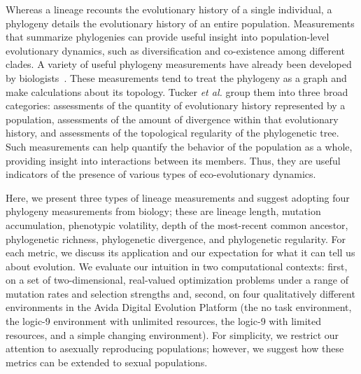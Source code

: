 \documentclass[letterpaper]{article}
\begin{document}
Whereas a lineage recounts the evolutionary history of a single individual, a phylogeny details the evolutionary history of an entire population. Measurements that summarize phylogenies can provide useful insight into population-level evolutionary dynamics, such as diversification and co-existence among different clades. A variety of useful phylogeny measurements have already been developed by biologists~\citep{tucker_guide_2017}. These measurements tend to treat the phylogeny as a graph and make calculations about its topology. Tucker \textit{et al.} group them into three broad categories: assessments of the quantity of evolutionary history represented by a population, assessments of the amount of divergence within that evolutionary history, and assessments of the topological regularity of the phylogenetic tree. Such measurements can help quantify the behavior of the population as a whole, providing insight into interactions between its members. Thus, they are useful indicators of the presence of various types of eco-evolutionary dynamics.

Here, we present three types of lineage measurements and suggest adopting four phylogeny measurements from biology; these are lineage length, mutation accumulation, phenotypic volatility, depth of the most-recent common ancestor, phylogenetic richness, phylogenetic divergence, and phylogenetic regularity.
For each metric, we discuss its application and our expectation for what it can tell us about evolution. 
We evaluate our intuition in two computational contexts: first, on a set of two-dimensional, real-valued optimization problems under a range of mutation rates and selection strengths and, second, on four qualitatively different environments in the Avida Digital Evolution Platform 
(the no task environment, the logic-9 environment with unlimited resources, the logic-9 with limited resources, and a simple changing environment).
For simplicity, we restrict our attention to asexually reproducing populations; however, we suggest how these metrics can be extended to sexual populations. 
\end{document}
